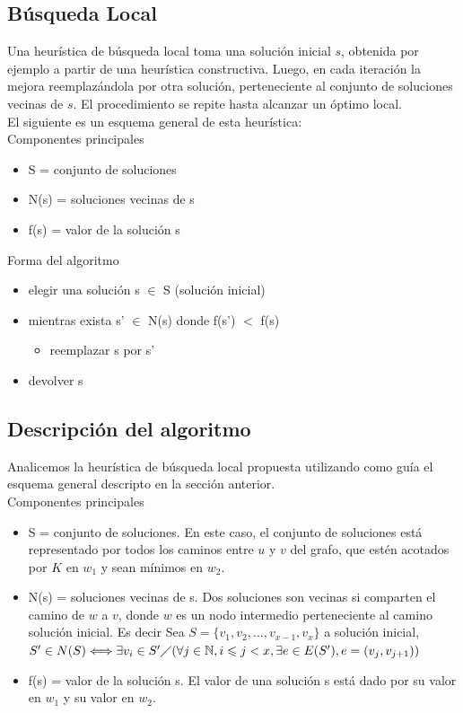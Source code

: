 \subsection{B\'usqueda Local}

Una heur\'istica de b\'usqueda local toma una soluci\'on inicial $s$, obtenida por ejemplo a partir de una heur\'istica constructiva. Luego, en cada iteraci\'on la mejora reemplaz\'andola por otra soluci\'on, perteneciente al conjunto de soluciones vecinas de $s$. El procedimiento se repite hasta alcanzar un \'optimo local.\\
El siguiente es un esquema general de esta heur\'istica:\\
Componentes principales

\begin{itemize}
\item S = conjunto de soluciones
\item N(s) = soluciones vecinas de s
\item f(s) = valor de la soluci\'on s
\end{itemize}

Forma del algoritmo
\begin{itemize}
\item elegir una soluci\'on s $\in$ S (soluci\'on inicial)
\item mientras exista s' $\in$ N(s) donde f(s') $<$ f(s)
\begin{itemize}
	\item reemplazar s por s'
\end{itemize}
\item devolver s
\end{itemize}

\subsection{Descripci\'on del algoritmo}

Analicemos la heur\'istica de b\'usqueda local propuesta utilizando como gu\'ia el esquema general descripto en la secci\'on anterior.\\

Componentes principales
\begin{itemize}
\item S = conjunto de soluciones. En este caso, el conjunto de soluciones est\'a representado por todos los caminos entre $u$ y $v$ del grafo, que est\'en acotados por $K$ en $w_1$ y sean m\'inimos en $w_2$.
\item N(s) = soluciones vecinas de s. Dos soluciones son vecinas si comparten el camino de $w$ a $v$, donde $w$ es un nodo intermedio perteneciente al camino soluci\'on inicial. 
Es decir Sea $S=\lbrace v_1, v_2, ..., v_{x-1}, v_x \rbrace$ a soluci\'on inicial,
\\
$S' \in N(S) \Longleftrightarrow \exists v_i \in S' \diagup 
(\forall j \in \mathbb{N}, i \leqslant j < x,
\exists e \in E(S'), e=(v_j,v_{j+1}))$
\item f(s) = valor de la soluci\'on s. El valor de una soluci\'on s est\'a dado por su valor en $w_1$ y su valor en $w_2$.
\end{itemize}

